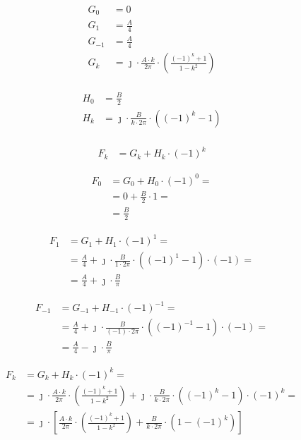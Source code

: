 \begin{task}
\begin{align*}
G_0&=0\\
G_1&=\frac{A}{4}\\
G_{-1}&=\frac{A}{4}\\
G_k&=\jmath \cdot \frac{A \cdot k}{2\pi} \cdot \left( \frac{ (-1)^{k}  + 1}{1 -k^2} \right)\\
\end{align*}

\begin{align*}
H_0&=\frac{B}{2}\\
H_k&=\jmath \cdot \frac{B}{k\cdot 2 \pi}\cdot \left( (-1)^{k} -1 \right)\\
\end{align*}


\begin{align*}
F_k&=G_k+H_k \cdot (-1)^k
\end{align*}

\begin{equation}
\begin{aligned}
F_0&=G_0 + H_0 \cdot (-1)^0=\\
 &= 0 + \frac{B}{2} \cdot 1=\\
 &= \frac{B}{2}
\end{aligned}
\end{equation}

\begin{equation}
\begin{aligned}
F_1&=G_1 + H_1 \cdot (-1)^1 =\\
&= \frac{A}{4} + \jmath \cdot \frac{B}{1\cdot 2 \pi}\cdot \left( (-1)^{1} -1 \right) \cdot (-1) =\\
&= \frac{A}{4} + \jmath \cdot \frac{B}{\pi}
\end{aligned}
\end{equation}

\begin{equation}
\begin{aligned}
F_{-1}&= G_{-1} + H_{-1}\cdot (-1)^{-1} =\\
&= \frac{A}{4} + \jmath \cdot \frac{B}{(-1)\cdot 2 \pi}\cdot \left( (-1)^{-1} -1 \right) \cdot (-1) =\\
&= \frac{A}{4} - \jmath \cdot \frac{B}{\pi}
\end{aligned}
\end{equation}

\begin{equation}
\begin{aligned}
F_k&=G_k+H_k \cdot (-1)^k = \\
&= \jmath \cdot \frac{A \cdot k}{2\pi} \cdot \left( \frac{ (-1)^{k}  + 1}{1 -k^2} \right) + \jmath \cdot \frac{B}{k\cdot 2 \pi}\cdot \left( (-1)^{k} -1 \right) \cdot (-1)^k=\\
&= \jmath \cdot \left[\frac{A \cdot k}{2\pi} \cdot \left( \frac{ (-1)^{k}  + 1}{1 -k^2} \right) + \frac{B}{k\cdot 2 \pi}\cdot \left( 1 - (-1)^{k}\right)\right]
\end{aligned}
\end{equation}

\end{task}